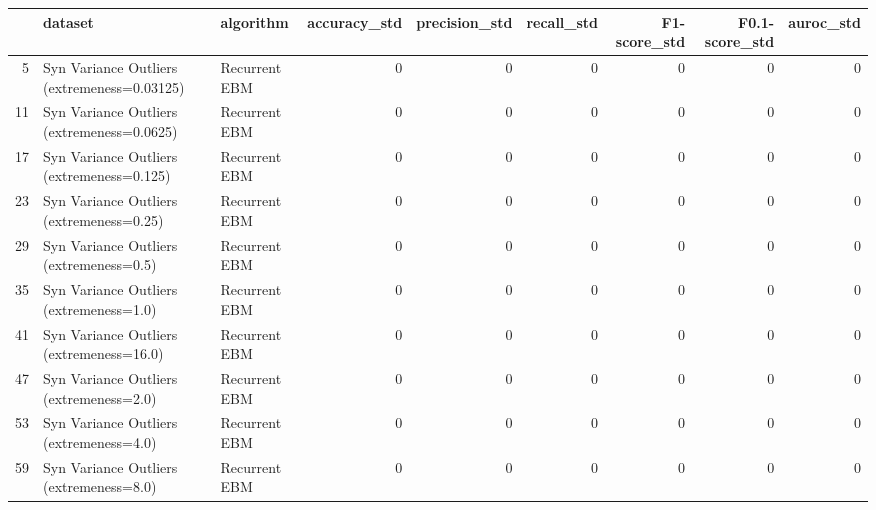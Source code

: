 \begin{tabular}{rllrrrrrr}
\hline
    & dataset                                     & algorithm     &   accuracy\_std &   precision\_std &   recall\_std &   F1-score\_std &   F0.1-score\_std &   auroc\_std \\
\hline
  5 & Syn Variance Outliers (extremeness=0.03125) & Recurrent EBM &              0 &               0 &            0 &              0 &                0 &           0 \\
 11 & Syn Variance Outliers (extremeness=0.0625)  & Recurrent EBM &              0 &               0 &            0 &              0 &                0 &           0 \\
 17 & Syn Variance Outliers (extremeness=0.125)   & Recurrent EBM &              0 &               0 &            0 &              0 &                0 &           0 \\
 23 & Syn Variance Outliers (extremeness=0.25)    & Recurrent EBM &              0 &               0 &            0 &              0 &                0 &           0 \\
 29 & Syn Variance Outliers (extremeness=0.5)     & Recurrent EBM &              0 &               0 &            0 &              0 &                0 &           0 \\
 35 & Syn Variance Outliers (extremeness=1.0)     & Recurrent EBM &              0 &               0 &            0 &              0 &                0 &           0 \\
 41 & Syn Variance Outliers (extremeness=16.0)    & Recurrent EBM &              0 &               0 &            0 &              0 &                0 &           0 \\
 47 & Syn Variance Outliers (extremeness=2.0)     & Recurrent EBM &              0 &               0 &            0 &              0 &                0 &           0 \\
 53 & Syn Variance Outliers (extremeness=4.0)     & Recurrent EBM &              0 &               0 &            0 &              0 &                0 &           0 \\
 59 & Syn Variance Outliers (extremeness=8.0)     & Recurrent EBM &              0 &               0 &            0 &              0 &                0 &           0 \\
\hline
\end{tabular}

